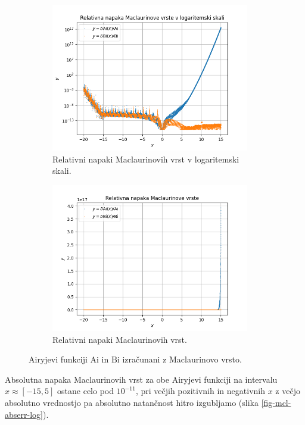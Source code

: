 \documentclass[a4paper, 12pt, slovene]{article}
\newcommand{\Ai}{\mathrm{Ai}}
\newcommand{\Bi}{\mathrm{Bi}}
\begin{document}
\begin{figure}[H]
\begin{subfigure}{0.49\textwidth}
	\includegraphics[width=0.95\textwidth]{grafi/maclaurin_rel_err.png}
	\caption{Relativni napaki Maclaurinovih vrst v logaritemski skali.}
	\label{fig-mcl-relerr-log}
\end{subfigure}
\begin{subfigure}{0.49\textwidth}
	\centering
	\includegraphics[width=0.95\textwidth]{grafi/maclaurin_rel_err_noscale.png}
	\caption{Relativni napaki Maclaurinovih vrst.}
	\label{fig-mcl-relerr}
\end{subfigure}

\caption{Airyjevi funkciji $\Ai$ in $\Bi$ izračunani z Maclaurinovo vrsto.}
\label{fig-maclaurin}
\end{figure}

Absolutna napaka Maclaurinovih vrst za obe Airyjevi funkciji na intervalu $x\approx[-15, 5]$ ostane celo pod $10^{-11}$, pri večjih pozitivnih in negativnih $x$ z večjo absolutno vrednostjo pa absolutno natančnost hitro izgubljamo (slika \ref{fig-mcl-abserr-log}). \par\vspace{5mm}
\end{document}
